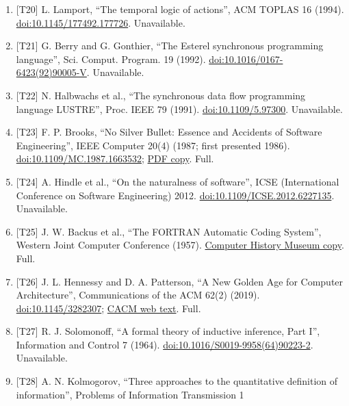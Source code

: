 \documentclass[10pt,letterpaper]{article}
\begin{document}
\begin{enumerate}
  systems'', Sci. Comput. Program. 8 (1987).
  \href{https://doi.org/10.1016/0167-6423(87)90035-9}{doi:10.1016/0167-6423(87)90035-9}.
  Unavailable.
\item
  {[}T20{]} L. Lamport, ``The temporal logic of actions'', ACM TOPLAS 16
  (1994).
  \href{https://doi.org/10.1145/177492.177726}{doi:10.1145/177492.177726}.
  Unavailable.
\item
  {[}T21{]} G. Berry and G. Gonthier, ``The Esterel synchronous
  programming language'', Sci. Comput. Program. 19 (1992).
  \href{https://doi.org/10.1016/0167-6423(92)90005-V}{doi:10.1016/0167-6423(92)90005-V}.
  Unavailable.
\item
  {[}T22{]} N. Halbwachs et al., ``The synchronous data flow programming
  language LUSTRE'', Proc. IEEE 79 (1991).
  \href{https://doi.org/10.1109/5.97300}{doi:10.1109/5.97300}.
  Unavailable.
\item
  {[}T23{]} F. P. Brooks, ``No Silver Bullet: Essence and Accidents of
  Software Engineering'', IEEE Computer 20(4) (1987; first presented
  1986).
  \href{https://doi.org/10.1109/MC.1987.1663532}{doi:10.1109/MC.1987.1663532};
  \href{https://worrydream.com/refs/Brooks_1986_-_No_Silver_Bullet.pdf}{PDF
  copy}. Full.
\item
  {[}T24{]} A. Hindle et al., ``On the naturalness of software'', ICSE
  (International Conference on Software Engineering) 2012.
  \href{https://doi.org/10.1109/ICSE.2012.6227135}{doi:10.1109/ICSE.2012.6227135}.
  Unavailable.
\item
  {[}T25{]} J. W. Backus et al., ``The FORTRAN Automatic Coding
  System'', Western Joint Computer Conference (1957).
  \href{https://archive.computerhistory.org/resources/text/Fortran/102663113.05.01.acc.pdf}{Computer
  History Museum copy}. Full.
\item
  {[}T26{]} J. L. Hennessy and D. A. Patterson, ``A New Golden Age for
  Computer Architecture'', Communications of the ACM 62(2) (2019).
  \href{https://doi.org/10.1145/3282307}{doi:10.1145/3282307};
  \href{https://cacm.acm.org/research/a-new-golden-age-for-computer-architecture/}{CACM
  web text}. Full.
\item
  {[}T27{]} R. J. Solomonoff, ``A formal theory of inductive inference,
  Part I'', Information and Control 7 (1964).
  \href{https://doi.org/10.1016/S0019-9958(64)90223-2}{doi:10.1016/S0019-9958(64)90223-2}.
  Unavailable.
\item
  {[}T28{]} A. N. Kolmogorov, ``Three approaches to the quantitative
  definition of information'', Problems of Information Transmission 1

\end{enumerate}
\end{document}

